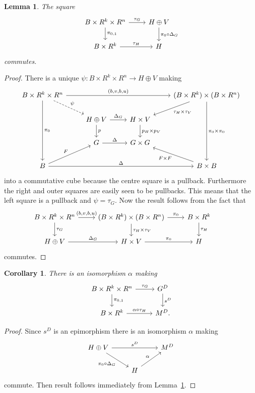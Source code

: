 \documentclass[10pt,a4paper]{amsart}
\numberwithin{equation}{section}
\newtheorem{Corollary}[Theorem]{Corollary}
\newtheorem{Lemma}[Theorem]{Lemma}
\begin{document}
\begin{Lemma}\label{lem:split-s}
The square
\begin{equation*}\begin{tikzcd}
B\times R^k \times R^n \rar{\tau_G} \dar{\pi_{0,1}} & H\oplus V \dar{\pi_0\circ\Delta_G}\\
B\times R^k \rar{\tau_H} & H
\end{tikzcd}\end{equation*}
commutes.
\end{Lemma}
\begin{proof}There is a unique $\psi\colon B\times R^k\times R^n\rightarrow H\oplus V$ making
\begin{equation*}
\begin{tikzcd}
B\times R^k\times R^n \arrow{ddd}{\pi_0} \drar[dashed]{\psi} \arrow{rrr}{(b,v,b,u)} &&& (B\times R^k)\times(B\times R^n) \arrow{ddd}{\pi_0\times\pi_0} \dlar{\tau_H\times\tau_V}\\
& H\oplus V \dar{p} \rar{\Delta_G} & H\times V \dar{p_H\times p_V} &\\
& G \rar{\Delta} & G\times G & \\
B \urar{F} \arrow{rrr}{\Delta} &&& B\times B \ular{F\times F}
\end{tikzcd}
\end{equation*}
into a commutative cube because the centre square is a pullback. Furthermore the right and outer squares are easily seen to be pullbacks. This means that the left square is a pullback and $\psi=\tau_G$. Now the result follows from the fact that
\begin{equation*}\begin{tikzcd}
B\times R^k \times R^n \rar{(b,v,b,u)} \dar{\tau_G} & (B\times R^k)\times(B\times R^n) \dar{\tau_H\times \tau_V} \rar{\pi_0} &B\times R^k \dar{\tau_H} &\\
H\oplus V \rar{\Delta_G} & H\times V \rar{\pi_0} & H
\end{tikzcd}\end{equation*}
commutes.
\end{proof}

\begin{Corollary}\label{cor:split-tangent}
There is an isomorphism $\alpha$ making
\begin{equation*}\begin{tikzcd}
B\times R^k\times R^n \rar{\tau_G} \dar{\pi_{0,1}}& G^D \dar{s^D}\\
B\times R^k \rar{\alpha\circ\tau_H} & M^D.
\end{tikzcd}\end{equation*}
\end{Corollary}
\begin{proof}
Since $s^D$ is an epimorphism there is an isomorphism $\alpha$ making
\begin{equation*}\begin{tikzcd}
H\oplus V \arrow{rr}{s^D} \drar[swap]{\pi_0\circ \Delta_G} &&M^D \\
&H \urar{\alpha}&
\end{tikzcd}\end{equation*}
commute. Then result follows immediately from Lemma~\ref{lem:split-s}.
\end{proof}
\end{document}
